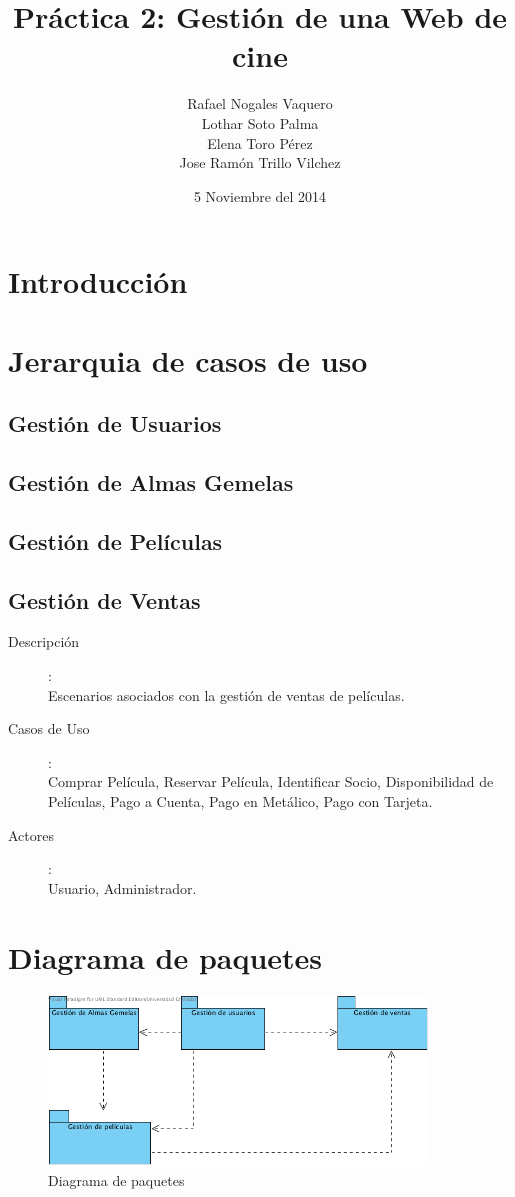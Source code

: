 \documentclass{article}
\title{Práctica 2: Gestión de una Web de cine}
\author{Rafael Nogales Vaquero
\\Lothar Soto Palma
\\Elena Toro Pérez
\\Jose Ramón Trillo Vilchez}
\date{5 Noviembre del 2014}
\begin{document}
\maketitle

\section{Introducción}
\section{Jerarquia de casos de uso}
\subsection*{Gestión de Usuarios}
\subsection*{Gestión de Almas Gemelas}
\subsection*{Gestión de Películas}
\subsection*{Gestión de Ventas}
\begin{description}
\item[Descripción]:\\ Escenarios asociados con la gestión de ventas de películas.
\item[Casos de Uso]:\\ Comprar Película, Reservar Película, Identificar Socio, Disponibilidad de Películas, Pago a Cuenta, Pago en Metálico, Pago con Tarjeta.
\item[Actores]:\\ Usuario, Administrador.
\end{description}
\section{Diagrama de paquetes}
\begin{figure}[!ht]
\begin{center}
  \includegraphics[width=0.9\textwidth]{Paquetes.png}
  \caption{Diagrama de paquetes}
\end{center}
\end{figure}
\end{document}
